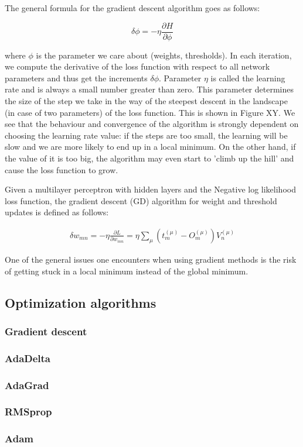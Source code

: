 The general formula for the gradient descent algorithm goes as follows:

$$ 
\delta \phi = - \eta \frac{\partial H}{\partial \phi}
$$

where $ \phi $ is the parameter we care about (weights, thresholds). In each iteration, we compute the derivative of the loss function with respect to all network parameters and thus get the increments $ \delta \phi $. Parameter $ \eta $ is called the learning rate and is always a small number greater than zero. This parameter determines the size of the step we take in the way of the steepest descent in the landscape (in case of two parameters) of the loss function. This is shown in Figure XY. We see that the behaviour and convergence of the algorithm is strongly dependent on choosing the learning rate value: if the steps are too small, the learning will be slow and we are more likely to end up in a local minimum. On the other hand, if the value of it is too big, the algorithm may even start to 'climb up the hill' and cause the loss function to grow. 

Given a multilayer perceptron with hidden layers and the Negative log likelihood loss function, the gradient descent (GD) algorithm for weight and threshold updates is defined as follows:

\begin{gather}
	\delta w_{mn} = - \eta \frac{\partial L}{\partial w_{mn}} = \eta \sum\limits_{\mu}
	(t_{m}^{(\mu)} - O_{m}^{(\mu)})V_{n}^{(\mu)}	
\end{gather}






One of the general issues one encounters when using gradient methods is the risk of getting stuck in a local minimum instead of the global minimum.




\subsection{Optimization algorithms}
\subsubsection{Gradient descent}
\subsubsection{AdaDelta}
\subsubsection{AdaGrad}
\subsubsection{RMSprop}
\subsubsection{Adam}




